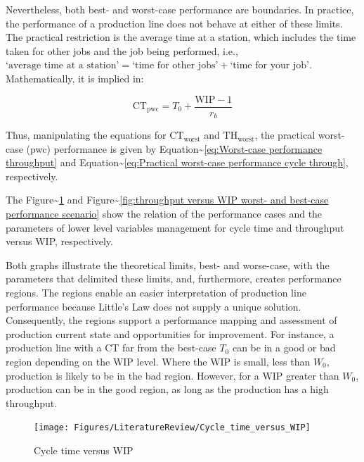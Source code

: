 \documentclass{article}
\begin{document}
Nevertheless, both best- and worst-case performance are boundaries.
In practice, the performance of a production line does not behave at either of these limits.
The practical restriction is the average time at a station, which includes the time taken for other jobs and the job being performed, i.e., \(\mbox{`average time at a station'} = \mbox{`time for other jobs'} + \mbox{`time for your job'}\).
Mathematically, it is implied in:

\begin{equation}
    \mbox{CT}_{\mbox{pwc}}=T_0 + \frac{\mbox{WIP}-1}{r_b}
\label{eq:Practical worst-case performance cycle through}
\end{equation}

Thus, manipulating the equations for \(\mbox{CT}_{\mbox{worst}}\) and \(\mbox{TH}_{\mbox{worst}}\), the practical worst-case (pwc) performance is given by Equation\textasciitilde{}\ref{eq:Worst-case performance throughput} and Equation\textasciitilde{}\ref{eq:Practical worst-case performance cycle through}, respectively.

The Figure\textasciitilde{}\ref{fig:Cycle time versus WIP} and Figure\textasciitilde{}\ref{fig:throughput versus WIP worst- and best-case performance scenario} show the relation of the performance cases and the parameters of lower level variables management for cycle time and throughput versus WIP, respectively.

Both graphs illustrate the theoretical limits, best- and worse-case, with the parameters that delimited these limits, and, furthermore, creates performance regions.
The regions enable an easier interpretation of production line performance because Little's Law does not supply a unique solution.
Consequently, the regions support a performance mapping and assessment of production current state and opportunities for improvement.
For instance, a production line with a CT far from the best-case \(T_0\) can be in a good or bad region depending on the WIP level.
Where the WIP is small, less than \(W_0\), production is likely to be in the bad region.
However, for a WIP greater than \(W_0\), production can be in the good region, as long as the production has a high throughput.

\begin{figure}[H]
  \centering
  \texttt{[image: Figures/LiteratureReview/Cycle\_time\_versus\_WIP]}
  \caption{Cycle time versus WIP}\label{fig:Cycle time versus WIP}
\end{figure}
\end{document}
